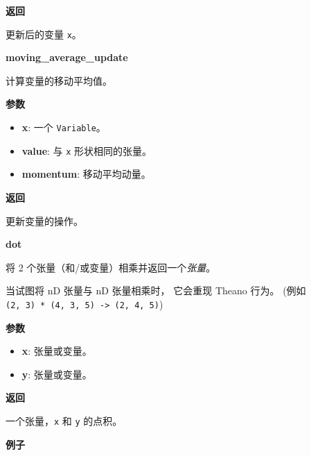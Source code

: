 \textbf{返回}

更新后的变量 \texttt{x}。


\textbf{moving\_average\_update}\label{movingux5faverageux5fupdate}

\begin{Shaded}
\begin{Highlighting}[]
\end{Highlighting}
\end{Shaded}

计算变量的移动平均值。

\textbf{参数}

\begin{itemize}
\tightlist
\item
  \textbf{x}: 一个 \texttt{Variable}。
\item
  \textbf{value}: 与 \texttt{x} 形状相同的张量。
\item
  \textbf{momentum}: 移动平均动量。
\end{itemize}

\textbf{返回}

更新变量的操作。


\textbf{dot}\label{dot}

\begin{Shaded}
\begin{Highlighting}[]
\end{Highlighting}
\end{Shaded}

将 2 个张量（和/或变量）相乘并返回一个\emph{张量}。

当试图将 nD 张量与 nD 张量相乘时， 它会重现 Theano 行为。 (例如
\texttt{(2,\ 3)\ *\ (4,\ 3,\ 5)\ -\textgreater{}\ (2,\ 4,\ 5)})

\textbf{参数}

\begin{itemize}
\tightlist
\item
  \textbf{x}: 张量或变量。
\item
  \textbf{y}: 张量或变量。
\end{itemize}

\textbf{返回}

一个张量，\texttt{x} 和 \texttt{y} 的点积。

\textbf{例子}

\begin{Shaded}
\begin{Highlighting}[]
\OperatorTok{>>>} \OperatorTok{=} \OperatorTok{=}\NormalTok{(}\NormalTok{, }\NormalTok{))}
\OperatorTok{>>>} \OperatorTok{=} \OperatorTok{=}\NormalTok{(}\NormalTok{, }\NormalTok{))}
\OperatorTok{>>>} \OperatorTok{=} 
\OperatorTok{>>>} 
\OperatorTok{<} \OperatorTok{=}\NormalTok{(}\NormalTok{, }\OperatorTok{=}\OperatorTok{>}
\end{Highlighting}
\end{Shaded}

